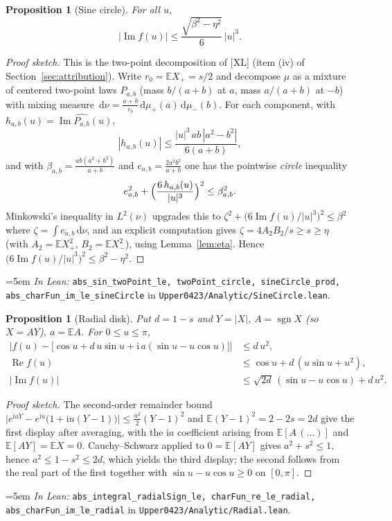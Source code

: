 \documentclass[11pt,a4paper]{article}
\newtheorem{proposition}[theorem]{Proposition}
\theoremstyle{definition}
\newcommand{\EE}{\mathbb{E}}
\newcommand{\ii}{\mathrm{i}}
\newcommand{\dd}{\,\mathrm{d}}
\newcommand{\Lean}[1]{\texttt{#1}}
\newcommand{\file}[1]{\texttt{#1}}
\newcommand{\formal}[2]{%
  \par\smallskip
  \begingroup\small\raggedright\emergencystretch=5em
  \noindent\textit{In Lean:} \Lean{#1} in \file{#2}.\par
  \endgroup\smallskip}
\begin{document}
\begin{proposition}[Sine circle]
  \label{prop:circle}
  For all $u$,
  \[
    |\operatorname{Im}f(u)|\le\frac{\sqrt{\beta^2-\eta^2}}{6}\,|u|^3 .
  \]
\end{proposition}

\begin{proof}[Proof sketch]
  This is the two-point decomposition of [XL] (item (iv) of
  Section~\ref{sec:attribution}). Write $r_0=\EE X_+=s/2$ and decompose $\mu$ as
  a mixture of centered two-point laws $P_{a,b}$ (mass $b/(a+b)$ at $a$, mass
  $a/(a+b)$ at $-b$) with mixing measure
  $\dd\nu=\tfrac{a+b}{r_0}\dd\mu_+(a)\dd\mu_-(b)$. For each component, with
  $h_{a,b}(u)=\operatorname{Im}\widehat{P_{a,b}}(u)$,
  \[
    |h_{a,b}(u)|\le\frac{|u|^3\,ab\,|a^2-b^2|}{6(a+b)},
  \]
  and with $\beta_{a,b}=\frac{ab(a^2+b^2)}{a+b}$ and
  $e_{a,b}=\frac{2a^2b^2}{a+b}$ one has the pointwise \emph{circle} inequality
  \[
    e_{a,b}^2+\Bigl(\frac{6\,h_{a,b}(u)}{|u|^3}\Bigr)^2\le \beta_{a,b}^2 .
  \]
  Minkowski's inequality in $L^2(\nu)$ upgrades this to
  $\zeta^2+\bigl(6\operatorname{Im}f(u)/|u|^3\bigr)^2\le\beta^2$ where
  $\zeta=\int e_{a,b}\dd\nu$, and an explicit computation gives
  $\zeta=4A_2B_2/s\ge s\ge\eta$ (with $A_2=\EE X_+^2$, $B_2=\EE X_-^2$), using
  Lemma~\ref{lem:eta}. Hence
  $\bigl(6\operatorname{Im}f(u)/|u|^3\bigr)^2\le\beta^2-\eta^2$.
\end{proof}
\formal{abs\_sin\_twoPoint\_le, twoPoint\_circle, sineCircle\_prod, abs\_charFun\_im\_le\_sineCircle}{Upper0423/Analytic/SineCircle.lean}

\begin{proposition}[Radial disk]
  \label{prop:radial}
  Put $d=1-s$ and $Y=|X|$, $A=\operatorname{sgn}X$ (so $X=AY$), $a=\EE A$. For
  $0\le u\le\pi$,
  \begin{align*}
    \bigl|f(u)-\bigl[\cos u+d\,u\sin u+\ii\,a(\sin u-u\cos u)\bigr]\bigr|
      &\le d\,u^2,\\
    \operatorname{Re}f(u)&\le\cos u+d\,(u\sin u+u^2),\\
    |\operatorname{Im}f(u)|&\le\sqrt{2d}\,(\sin u-u\cos u)+d\,u^2 .
  \end{align*}
\end{proposition}

\begin{proof}[Proof sketch]
  The second-order remainder bound
  $\bigl|e^{\ii uY}-e^{\ii u}\bigl(1+\ii u(Y-1)\bigr)\bigr|\le\tfrac{u^2}2(Y-1)^2$
  and $\EE(Y-1)^2=2-2s=2d$ give the first display after averaging, with the
  $\ii a$ coefficient arising from $\EE[A\,(\ldots)]$ and $\EE[AY]=\EE X=0$.
  Cauchy--Schwarz applied to $0=\EE[AY]$ gives $a^2+s^2\le1$, hence
  $a^2\le1-s^2\le2d$, which yields the third display; the second follows from
  the real part of the first together with $\sin u-u\cos u\ge0$ on $[0,\pi]$.
\end{proof}
\formal{abs\_integral\_radialSign\_le, charFun\_re\_le\_radial, abs\_charFun\_im\_le\_radial}{Upper0423/Analytic/Radial.lean}
\end{document}
